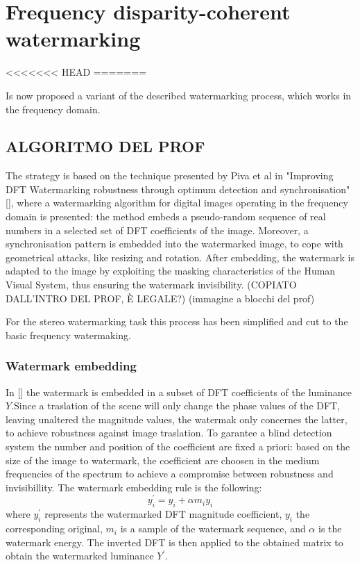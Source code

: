 \chapter{Frequency disparity-coherent watermarking}
\label{dft}

<<<<<<< HEAD
=======

Is now proposed a variant of the described watermarking process, which works in the frequency domain.

\section{ALGORITMO DEL PROF}

The strategy is based on the technique presented by Piva et al in "Improving DFT Watermarking robustness through optimum detection and synchronisation" [], where a watermarking algorithm for digital images operating in the frequency domain is presented: the method embeds a pseudo-random sequence of real numbers in a selected set of DFT coefficients of the image. Moreover, a synchronisation pattern is embedded into the watermarked image, to cope with geometrical attacks, like resizing and rotation. After embedding, the watermark is adapted to the image by exploiting the masking characteristics of the Human Visual System, thus ensuring the watermark invisibility. (COPIATO DALL'INTRO DEL PROF, È LEGALE?)\newline
(immagine a blocchi del prof)

For the stereo watermarking task this process has been simplified and cut to the basic frequency watermaking.

\subsection{Watermark embedding}

In [] the watermark is embedded in a subset of DFT coefficients of the luminance $Y$.\newline Since a traslation of the scene will only change the phase values of the DFT, leaving unaltered the magnitude values, the watermak only concernes the latter, to achieve robustness against image traslation.\newline
To garantee a blind detection system the number and position of the coefficient are fixed a priori: based on the size of the image to watermark, the coefficient are choosen in the medium frequencies of the spectrum to achieve a compromise between robustness and invisibillity.\newline 
The watermark embedding rule is the following:
$$y_{i}^{'} = y_{i}+\alpha m_{i}y_{i} $$
where $y_{i}^{'}$ represents the watermarked DFT magnitude coefficient, $y_{i}$ the corresponding original, $m_{i}$ is a sample of the watermark sequence, and $\alpha$ is the watermark energy.\newline
The inverted DFT is then applied to the obtained matrix to obtain the watermarked luminance $Y^{'}$.

